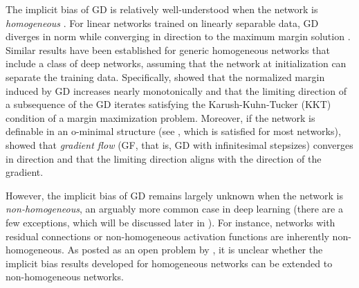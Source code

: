 The implicit bias of GD is relatively well-understood when the network is \emph{homogeneous} \citep[see][and references therein]{soudry2018implicit,ji2018risk,lyu2020gradient,ji2020directional,wu2023implicit}. 
For linear networks trained on linearly separable data, GD diverges in norm while converging in direction to the maximum margin solution \citep{soudry2018implicit,ji2018risk,wu2023implicit}.
Similar results have been established for generic homogeneous networks that include a class of deep networks, assuming that the network at initialization can separate the training data. 
Specifically, \citet{lyu2020gradient} showed that the normalized margin induced by GD increases nearly monotonically and that the limiting direction of a subsequence of the GD iterates satisfying the Karush-Kuhn-Tucker (KKT) condition of a margin maximization problem.
Moreover, if the network is definable in an o-minimal structure (see , which is satisfied for most networks), \citet{ji2020directional} showed that \emph{gradient flow} (GF, that is, GD with infinitesimal stepsizes) converges in direction and that the limiting direction aligns with the direction of the gradient.

However, the implicit bias of GD remains largely unknown when the network is \emph{non-homogeneous}, an arguably more common case in deep learning (there are a few exceptions, which will be discussed later in ). 
For instance, networks with residual connections or non-homogeneous activation functions are inherently non-homogeneous. 
As posted as an open problem by \citet{ji2020directional}, it is unclear whether the implicit bias results developed for homogeneous networks can be extended to non-homogeneous networks.


